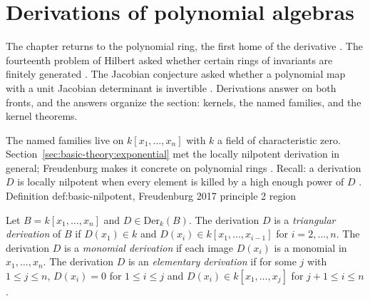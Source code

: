 \section{Derivations of polynomial algebras}\label{sec:polynomial-weyl:polynomial}

The chapter returns to the polynomial ring, the first home of the derivative
\cite[p.~xii]{Freudenburg2017}. The fourteenth problem of Hilbert asked
whether certain rings of invariants are finitely generated
\cite[p.~xii]{Freudenburg2017}. The Jacobian
conjecture asked whether a polynomial map with a unit Jacobian determinant is
invertible \cite[p.~xii]{Freudenburg2017}. Derivations answer on both fronts,
and the answers organize the section: kernels, the named families, and the
kernel theorems.

The named families live on $k[x_{1},\dots,x_{n}]$ with $k$ a field of
characteristic zero. Section~\ref{sec:basic-theory:exponential} met the
locally nilpotent derivation in general; Freudenburg makes it concrete on
polynomial rings \cite[p.~76]{Freudenburg2017}. Recall: a derivation $D$ is
locally nilpotent when every element is killed by a high enough power of $D$
\cite[p.~21]{Freudenburg2017}.
Definition def:basic-nilpotent, Freudenburg 2017 principle 2 region

\begin{definition}\label{def:pw:triangular}
Let $B=k[x_{1},\dots,x_{n}]$ and $D\in\mathrm{Der}_{k}(B)$. The derivation
$D$ is a \emph{triangular derivation} of $B$ if $D(x_{1})\in k$ and
$D(x_{i})\in k[x_{1},\dots,x_{i-1}]$ for $i=2,\dots,n$. The derivation $D$
is a \emph{monomial derivation} if each image $D(x_{i})$ is a monomial in
$x_{1},\dots,x_{n}$. The derivation $D$ is an \emph{elementary derivation}
if for some $j$ with $1\leq j\leq n$, $D(x_{i})=0$ for $1\leq i\leq j$ and
$D(x_{i})\in k[x_{1},\dots,x_{j}]$ for $j+1\leq i\leq n$.
\end{definition}

